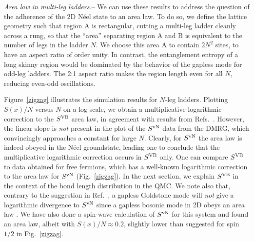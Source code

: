 \documentclass[prl,aps,twocolumn,floatfix,amsmath,amssymb,superscriptaddress,tightenlines]{revtex4}
\begin{document}
 
{\it Area law in multi-leg ladders.}--  
We can use these results to address the question of the adherence of the 2D N\'eel state
to an area law.  To do so, we
define the lattice
geometry such that region A is rectangular, cutting a multi-leg ladder
cleanly across a rung, so that the ``area'' separating region A and B is
equivalent to the number of legs in the ladder $N$.  We choose this area A
to contain $2N^2$ sites, to have an aspect ratio of order unity.  In
contrast, the entanglement entropy of a long
skinny region would be dominated by the behavior
of the gapless mode for odd-leg ladders.
The 2:1 aspect ratio makes the region length even for all $N$, reducing even-odd oscillations.

Figure~\ref{zigzag} illustrates the simulation results for $N$-leg ladders.
Plotting $S(x)/N$ versus $N$ on a log scale, we obtain a
multiplicative logarithmic correction to the $S^{\rm VB}$ area law, in agreement
with results from Refs.~\cite{Alet,Chh}.  However, the linear slope is {\it not} present in
the plot of the $S^{ \rm vN}$ data from the DMRG, which convincingly approaches a
constant for large $N$.  Clearly, for $S^{ \rm vN}$ the area law is
indeed obeyed in the N\'eel groundstate, leading one to conclude that the
multiplicative logarithmic correction occurs in $S^{\rm VB}$ only.  One can
compare $S^{\rm VB}$ to data obtained for free fermions, which has a well-known \cite{2dfermion} logarithmic correction to the area law for $S^{ \rm vN}$ (Fig.~\ref{zigzag}).
In the next section, we explain $S^{\rm VB}$
in the context of the bond length distribution in the QMC.
We note also that, contrary to the suggestion in Ref.~\cite{Alet}, a gapless Goldstone mode will {\it not} give a logarithmic
divergence to $S^{ \rm vN}$ since a gapless bosonic mode in 2D
obeys an area law \cite{2dboson}.  We have also done a spin-wave calculation of
$S^{\rm vN}$ for this system and found an area law, albeit with
$S(x)/N\approx 0.2$, slightly lower than suggested for spin~$1/2$ in Fig.~\ref{zigzag}.
\end{document}
